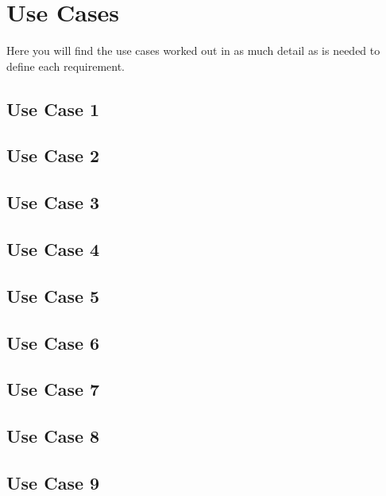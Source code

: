 \newpage

\section{Use Cases}
Here you will find the use cases worked out in as much detail as is needed to define each requirement.

\subsection{Use Case 1}

\subsection{Use Case 2}

\subsection{Use Case 3}

\subsection{Use Case 4}

\subsection{Use Case 5}

\subsection{Use Case 6}

\subsection{Use Case 7}

\subsection{Use Case 8}

\subsection{Use Case 9}



